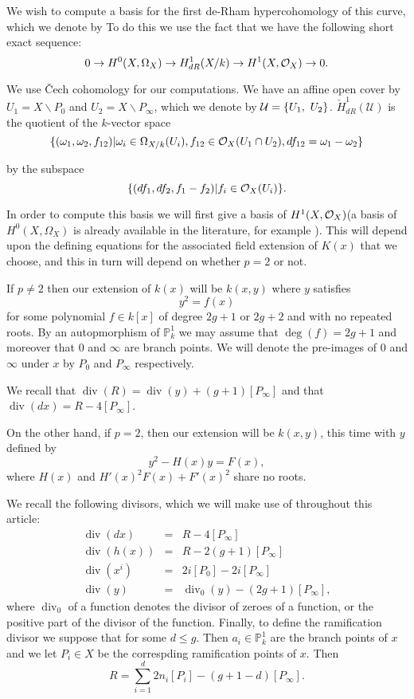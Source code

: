 \documentclass[draft, 11pt]{article} %
\theoremstyle{plain}
\theoremstyle{remark}
\newcommand{\cO}{{\cal O}}
\newcommand{\ra}{\rightarrow}
\newcommand{\cU}{{\mathcal U}}
\DeclareMathOperator{\di}{div}
\begin{document}
We wish to compute a basis for the first de-Rham hypercohomology of this curve, which we denote by  
To do this we use the fact that we have the following short exact sequence:
\begin{equation}\label{ses}
0 \ra H^0(X,\Omega_X) \ra H^1_{dR}(X/k) \ra H^1(X,\cO_X) \ra 0.
\end{equation}

We use \v{C}ech cohomology for our computations.
We have an affine open cover by $U_1 = X\backslash P_0$ and $U_2 = X \backslash P_\infty$, which we denote by ${\cal U} = \{ U_1, \ U_2\}$.
  $\check{H}_{dR}^1(\cU)$ is the quotient of the $k$-vector space 
\[
\{(\omega_1, \omega_2, f_{12}) | \omega_i\in \Omega_{X/k}(U_i), f_{12}\in \cO_X(U_1 \cap U_2), df_{12} = \omega_1 - \omega_2\}
\]

by the subspace
\[
\{ (df_1, df_2, f_1-f_2)|f_i \in \cO_X(U_i)\}.
\]

In order to compute this basis we will first give a basis of $H^1(X,\cO_X)$(a basis of $H^0(X,\Omega_X)$ is already available in the literature, for example ). This will depend upon the defining equations for the associated field extension of $K(x)$ that we choose, and this in turn will depend on whether $p=2$ or not.

If $p \neq 2$ then our extension of $k(x)$ will be $k(x,y)$ where $y$ satisfies 
\[
	y^2 = f(x)
\]
for some polynomial $f \in k[x]$ of degree $2g+1$ or $2g+2$ and with no repeated roots.
By an autopmorphism of $\mathbb P_k^1$ we may assume that $\deg(f) = 2g+1$ and moreover that $0$ and $\infty$ are branch points.
We will denote the pre-images of $0$ and $\infty$ under $x$ by $P_0$ and $P_\infty$ respectively.

We recall that $\di (R) = \di(y) + (g+1)[P_\infty]$ and that $\di( dx) = R - 4[P_\infty]$.

On the other hand, if $p=2$, then our extension will be $k(x,y)$, this time with $y$ defined by
\[
	y^2 - H(x)y = F(x),
\]
where $H(x)$ and $H'(x)^2F(x) + F'(x)^2$ share no roots.

We recall the following divisors, which we will make use of throughout this article:
\begin{eqnarray*}
\di (dx) & = & R - 4[P_\infty] \\
\di (h(x)) & = & R - 2(g+1)[P_\infty] \\
\di (x^i) & = & 2i[P_0] - 2i[P_\infty]\\
\di (y) & = & \di_0(y) - (2g+1)[P_\infty],
\end{eqnarray*}
where $\di_0$ of a function denotes the divisor of zeroes of a function, or the positive part of the divisor of the function.
Finally, to define the ramification divisor we suppose that  for some $d \leq g$.
Then $a_i \in \mathbb P_k^1$ are the branch points of $x$ and we let $P_i \in X$ be the correspding ramification points of $x$.
Then 
\[
R = \sum_{i=1}^d 2n_i[P_i] - (g+1-d)[P_\infty].
\]
\end{document}
